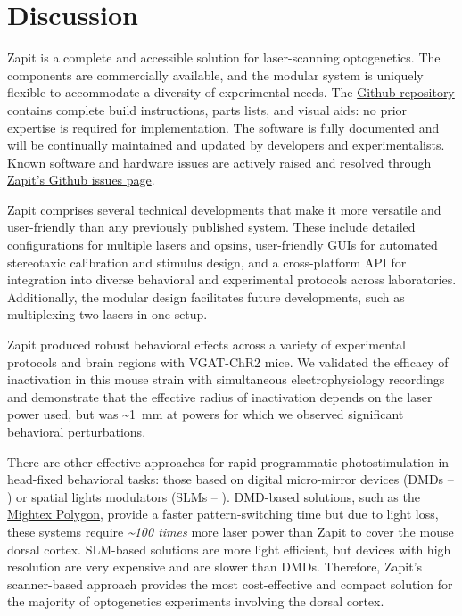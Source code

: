 \documentclass[9pt,lineno]{elife}
\begin{document}
\section{Discussion}

Zapit is a complete and accessible solution for laser-scanning optogenetics.
The components are commercially available, and the modular system is uniquely flexible to accommodate a diversity of experimental needs.
The \href{https://github.com/Zapit-Optostim/zapit}{Github repository} contains complete build instructions, parts lists, and visual aids: no prior expertise is required for implementation.
The software is fully documented and will be continually maintained and updated by developers and experimentalists.
Known software and hardware issues are actively raised and resolved through \href{https://github.com/Zapit-Optostim/zapit/issues}{Zapit's Github issues page}.

Zapit comprises several technical developments that make it more versatile and user-friendly than any previously published system.
These include detailed configurations for multiple lasers and opsins, user-friendly GUIs for automated stereotaxic calibration and stimulus design, and a cross-platform API for integration into diverse behavioral and experimental protocols across laboratories.
Additionally, the modular design facilitates future developments, such as multiplexing two lasers in one setup.

Zapit produced robust behavioral effects across a variety of experimental protocols and brain regions with VGAT-ChR2 mice.
We validated the efficacy of inactivation in this mouse strain with simultaneous electrophysiology recordings and demonstrate that the effective radius of inactivation depends on the laser power used, but was \textasciitilde{}1~mm at powers for which we observed significant behavioral perturbations.

There are other effective approaches for rapid programmatic photostimulation in head-fixed behavioral tasks: those based on digital micro-mirror devices (DMDs -- \citealp{Chong2020ManipulatingPerception}) or spatial lights modulators (SLMs --  \citealp{Russell2022All-opticalMice, Gauld2024APerception}).
DMD-based solutions, such as the \href{https://www.mightexbio.com/polygon/}{Mightex Polygon}, provide a faster pattern-switching time but due to light loss, these systems require \textit{\textasciitilde{}100 times} more laser power than Zapit to cover the mouse dorsal cortex.
SLM-based solutions are more light efficient, but devices with high resolution are very expensive and are slower than DMDs.
Therefore, Zapit's scanner-based approach provides the most cost-effective and compact solution for the majority of optogenetics experiments involving the dorsal cortex.
\end{document}
